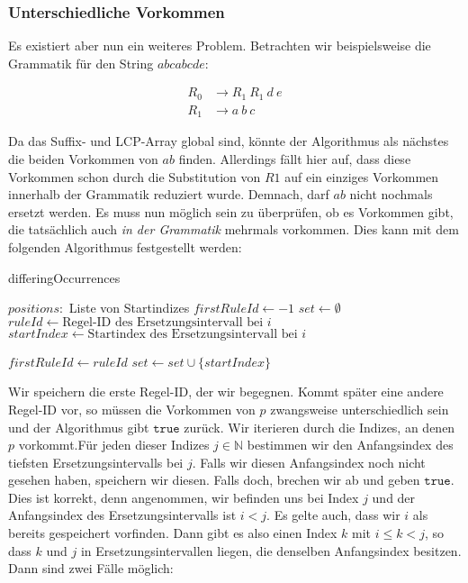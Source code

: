 \subsubsection{Unterschiedliche Vorkommen}

Es existiert aber nun ein weiteres Problem. Betrachten wir beispielsweise die Grammatik für den String $abcabcde$:

\begin{align*}
	R_0 &\rightarrow R_1\ R_1\ d\ e\\
	R_1 &\rightarrow a\ b\ c
\end{align*}

Da das Suffix- und LCP-Array global sind, könnte der Algorithmus als nächstes die beiden Vorkommen von $ab$ finden. 
Allerdings fällt hier auf, dass diese Vorkommen schon durch die Substitution von $R1$ auf ein einziges Vorkommen innerhalb der Grammatik reduziert wurde. Demnach, darf $ab$ nicht nochmals ersetzt werden. 
Es muss nun möglich sein zu überprüfen, ob es Vorkommen gibt, die tatsächlich auch \emph{in der Grammatik} mehrmals vorkommen.
Dies kann mit dem folgenden Algorithmus festgestellt werden:

\begin{algorithm}
	\caption{differingOccurrences}
	\begin{algorithmic}
		\REQUIRE $positions:$ Liste von Startindizes
		\STATE $firstRuleId \leftarrow -1$
		\STATE $set \leftarrow \emptyset$
			\STATE $ruleId \leftarrow \text{Regel-ID des Ersetzungsintervall bei } i$
			\STATE $startIndex \leftarrow \text{Startindex des Ersetzungsintervall bei } i$
			
				\STATE $firstRuleId \leftarrow ruleId$
				\RETURN \TRUE
			\ENDIF
			\STATE $set \leftarrow set \cup \{startIndex\}$
		\ENDFOR
		\RETURN \FALSE
	\end{algorithmic}
\end{algorithm}

Wir speichern die erste Regel-ID, der wir begegnen. Kommt später eine andere Regel-ID vor, so müssen die Vorkommen von $p$ zwangsweise unterschiedlich sein und der Algorithmus gibt $\texttt{true}$ zurück.
Wir iterieren durch die Indizes, an denen $p$ vorkommt.Für jeden dieser Indizes $j \in \mathbb{N}$ bestimmen wir den Anfangsindex des tiefsten Ersetzungsintervalls bei $j$. 
Falls wir diesen Anfangsindex noch nicht gesehen haben, speichern wir diesen. Falls doch, brechen wir ab und geben $\texttt{true}$. 
Dies ist korrekt, denn angenommen, wir befinden uns bei Index $j$ und der Anfangsindex des Ersetzungsintervalls ist $i < j$. Es gelte auch, dass wir $i$ als bereits gespeichert vorfinden. Dann gibt es also einen Index $k$ mit $i \leq k < j$, so dass $k$ und $j$ in Ersetzungsintervallen liegen, die denselben Anfangsindex besitzen. Dann sind zwei Fälle möglich:

